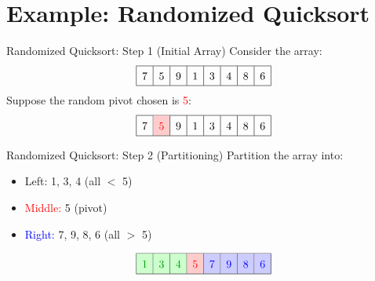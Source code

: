 \documentclass[aspectratio=169]{beamer}
\begin{document}
\section{Example: Randomized Quicksort}
\begin{frame}{Randomized Quicksort: Step 1 (Initial Array)}
  Consider the array:
  \[
    \renewcommand{\arraystretch}{1.5}
    \begin{array}{|c|c|c|c|c|c|c|c|}
      \hline
      7 & 5 & 9 & 1 & 3 & 4 & 8 & 6 \\
      \hline
    \end{array}
  \]
  \pause
  Suppose the random pivot chosen is \textcolor{red}{5}:
  \[
    \renewcommand{\arraystretch}{1.5}
    \begin{array}{|c|c|c|c|c|c|c|c|}
      \hline
      7 & \cellcolor{red!20}\textcolor{red}{5} & 9 & 1 & 3 & 4 & 8 & 6 \\
      \hline
    \end{array}
  \]
\end{frame}

\begin{frame}{Randomized Quicksort: Step 2 (Partitioning)}
  Partition the array into:
  \begin{itemize}
    \item \textcolor{green!60!black}{Left:} 1, 3, 4 (all $<$ 5)
    \item \textcolor{red}{Middle:} 5 (pivot)
    \item \textcolor{blue}{Right:} 7, 9, 8, 6 (all $>$ 5)
  \end{itemize}
  \pause
  \[
    \renewcommand{\arraystretch}{1.5}
    \begin{array}{|c|c|c|c|c|c|c|c|}
      \hline
      \cellcolor{green!20}\textcolor{green!60!black}{1} & \cellcolor{green!20}\textcolor{green!60!black}{3} & \cellcolor{green!20}\textcolor{green!60!black}{4} & \cellcolor{red!20}\textcolor{red}{5} & \cellcolor{blue!20}\textcolor{blue}{7} & \cellcolor{blue!20}\textcolor{blue}{9} & \cellcolor{blue!20}\textcolor{blue}{8} & \cellcolor{blue!20}\textcolor{blue}{6} \\
      \hline
    \end{array}
  \]
\end{frame}
\end{document}
